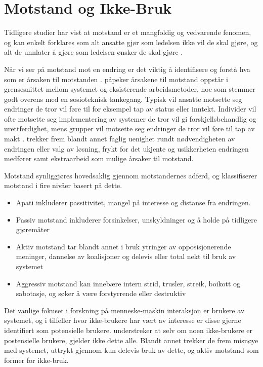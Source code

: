 \section{Motstand og Ikke-Bruk}
\label{sec:motstand}

Tidligere studier har vist at motstand er et mangfoldig og vedvarende fenomen, og kan enkelt forklares som alt ansatte gjør som ledelsen ikke vil de skal gjøre, og alt de unnlater å gjøre som ledelsen ønsker de skal gjøre \citep{Timmons03}. 

\noindent
Når vi ser på motstand mot en endring er det viktig å identifisere og forstå hva som er årsaken til motstanden \citep{Lapointe05}. \citet{Timmons03} påpeker årsakene til motstand oppstår i grensesnittet mellom systemet og eksisterende arbeidsmetoder, noe som stemmer godt overens med en sosioteknisk tankegang. Typisk vil ansatte motsette seg endringer de tror vil føre til for eksempel tap av status eller inntekt. Individer vil ofte motsette seg implementering av systemer de tror vil gi forskjellsbehandlig og urettferdighet, mens grupper vil motsette seg endringer de tror vil føre til tap av makt \citep{Lapointe05}. \citet{Jacobsen12} trekker frem blandt annet faglig uenighet rundt nødvendigheten av endringen eller valg av løsning, frykt for det ukjente og usikkerheten endringen medfører samt ekstraarbeid som mulige årsaker til motstand.

\noindent
Motstand synliggjøres hovedsaklig gjennom motstandernes adferd, og \citep{Lapointe05} klassifiserer motstand i fire nivåer basert på dette.

\begin{itemize}
\item Apati inkluderer passitivitet, mangel på interesse og distanse fra endringen.
\item Passiv motstand inkluderer forsinkelser, unskyldninger og å holde på tidligere gjøremåter
\item Aktiv motstand tar blandt annet i bruk ytringer av opposisjonerende meninger, dannelse av koalisjoner og delevis eller total nekt til bruk av systemet
\item Aggressiv motstand kan innebære intern strid, trusler, streik, boikott og sabotasje, og søker å være forstyrrende eller destruktiv
\end{itemize}

\noindent
Det vanlige fokuset i forskning på menneske-maskin interaksjon er brukere av systemet, og i tilfeller hvor ikke-brukere har vært av interesse er disse gjerne identifiert som potensielle brukere. 
\citet{Satchell09} understreker at selv om noen ikke-brukere er postensielle brukere, gjelder ikke dette alle. Blandt annet trekker de frem misnøye med systemet, uttrykt gjennom kun delevis bruk av dette, og aktiv motstand som former for ikke-bruk.

